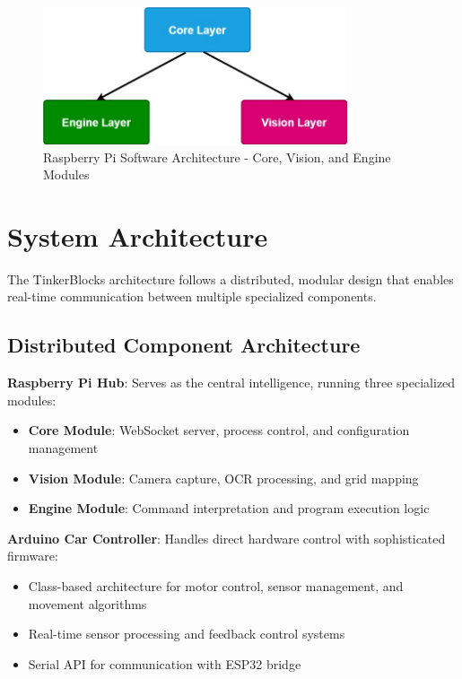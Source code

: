 \begin{figure}[H]
    \centering
    \includegraphics[width=0.8\textwidth]{assets/System_Arch.jpg}
    \caption{Raspberry Pi Software Architecture - Core, Vision, and Engine Modules}
    \label{fig:raspberry_pi_architecture}
\end{figure}

\section{System Architecture}

The TinkerBlocks architecture follows a distributed, modular design that enables real-time communication between multiple specialized components.

\subsection{Distributed Component Architecture}

\textbf{Raspberry Pi Hub}: Serves as the central intelligence, running three specialized modules:
\begin{itemize}
    \item \textbf{Core Module}: WebSocket server, process control, and configuration management
    \item \textbf{Vision Module}: Camera capture, OCR processing, and grid mapping
    \item \textbf{Engine Module}: Command interpretation and program execution logic
\end{itemize}

\textbf{Arduino Car Controller}: Handles direct hardware control with sophisticated firmware:
\begin{itemize}
    \item Class-based architecture for motor control, sensor management, and movement algorithms
    \item Real-time sensor processing and feedback control systems
    \item Serial API for communication with ESP32 bridge
\end{itemize}

